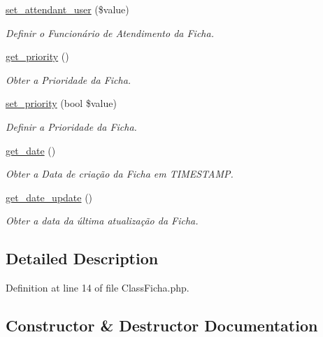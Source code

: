 \begin{DoxyCompactItemize}
\hyperlink{class_class_ficha_a0aca98dbfbc3b9580208f2ca5690aca3}{set\+\_\+attendant\+\_\+user} (\$value)
\begin{DoxyCompactList}\small\item\em Definir o Funcionário de Atendimento da Ficha. \end{DoxyCompactList}\item 
\hyperlink{class_class_ficha_a806364a3a299a2b99db62a4393c92855}{get\+\_\+priority} ()
\begin{DoxyCompactList}\small\item\em Obter a Prioridade da Ficha. \end{DoxyCompactList}\item 
\hyperlink{class_class_ficha_ab92929a73f7f8e23561ad86f989a6c80}{set\+\_\+priority} (bool \$value)
\begin{DoxyCompactList}\small\item\em Definir a Prioridade da Ficha. \end{DoxyCompactList}\item 
\hyperlink{class_class_ficha_a848589b82df6900da2764018f69cd8c4}{get\+\_\+date} ()
\begin{DoxyCompactList}\small\item\em Obter a Data de criação da Ficha em T\+I\+M\+E\+S\+T\+A\+MP. \end{DoxyCompactList}\item 
\hyperlink{class_class_ficha_ab88c852c9268bc8bf4f41240068dc81e}{get\+\_\+date\+\_\+update} ()
\begin{DoxyCompactList}\small\item\em Obter a data da última atualização da Ficha. \end{DoxyCompactList}\end{DoxyCompactItemize}


\subsection{Detailed Description}


Definition at line 14 of file Class\+Ficha.\+php.



\subsection{Constructor \& Destructor Documentation}
\mbox{\label{class_class_ficha_a3a06b9d4c5367aa8594f8b8a280ba4af}} 
